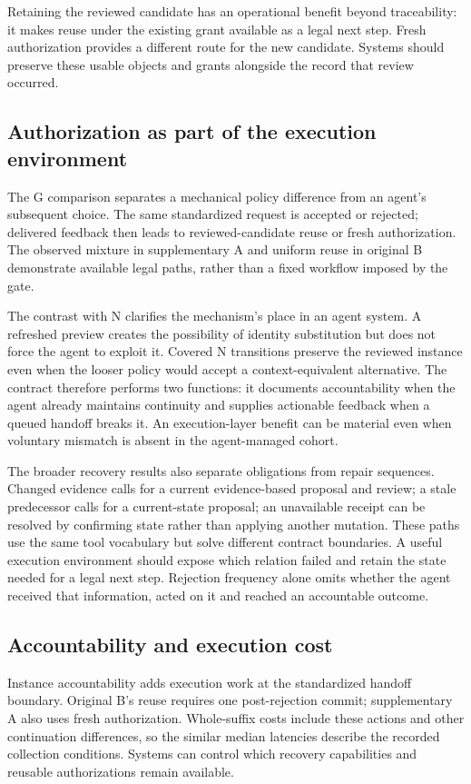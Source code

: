 \documentclass[10pt,a4paper,twocolumn]{article}
\begin{document}
Retaining the reviewed candidate has an operational benefit beyond traceability: it makes reuse under the existing grant available as a legal next step. Fresh authorization provides a different route for the new candidate. Systems should preserve these usable objects and grants alongside the record that review occurred.

\subsection{Authorization as part of the execution environment}
The G comparison separates a mechanical policy difference from an agent's subsequent choice. The same standardized request is accepted or rejected; delivered feedback then leads to reviewed-candidate reuse or fresh authorization. The observed mixture in supplementary A and uniform reuse in original B demonstrate available legal paths, rather than a fixed workflow imposed by the gate.

The contrast with N clarifies the mechanism's place in an agent system. A refreshed preview creates the possibility of identity substitution but does not force the agent to exploit it. Covered N transitions preserve the reviewed instance even when the looser policy would accept a context-equivalent alternative. The contract therefore performs two functions: it documents accountability when the agent already maintains continuity and supplies actionable feedback when a queued handoff breaks it. An execution-layer benefit can be material even when voluntary mismatch is absent in the agent-managed cohort.

The broader recovery results also separate obligations from repair sequences. Changed evidence calls for a current evidence-based proposal and review; a stale predecessor calls for a current-state proposal; an unavailable receipt can be resolved by confirming state rather than applying another mutation. These paths use the same tool vocabulary but solve different contract boundaries. A useful execution environment should expose which relation failed and retain the state needed for a legal next step. Rejection frequency alone omits whether the agent received that information, acted on it and reached an accountable outcome.

\subsection{Accountability and execution cost}
Instance accountability adds execution work at the standardized handoff boundary. Original B's reuse requires one post-rejection commit; supplementary A also uses fresh authorization. Whole-suffix costs include these actions and other continuation differences, so the similar median latencies describe the recorded collection conditions. Systems can control which recovery capabilities and reusable authorizations remain available.
\end{document}
